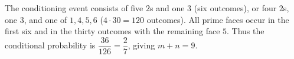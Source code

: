 The conditioning event consists of five $2$s and one $3$ (six outcomes), or four $2$s, one $3$, and one of $1,4,5,6$ ($4\cdot30=120$ outcomes). All prime faces occur in the first six and in the thirty outcomes with the remaining face $5$. Thus the conditional probability is $\dfrac{36}{126}=\dfrac{2}{7}$, giving $m+n=\boxed9$.
